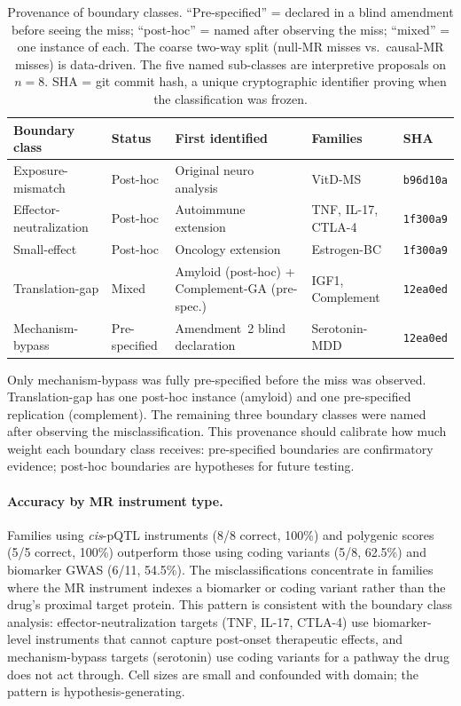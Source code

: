 \documentclass[11pt]{article}
\begin{document}
\begin{table}[t]
\centering
\caption{Provenance of boundary classes. ``Pre-specified'' = declared in a blind amendment before seeing the miss; ``post-hoc'' = named after observing the miss; ``mixed'' = one instance of each. The coarse two-way split (null-MR misses vs.\ causal-MR misses) is data-driven. The five named sub-classes are interpretive proposals on $n = 8$. SHA = git commit hash, a unique cryptographic identifier proving when the classification was frozen.}
\label{tab:provenance}
\small
\begin{tabular}{lllll}
\toprule
Boundary class & Status & First identified & Families & SHA \\
\midrule
Exposure-mismatch & Post-hoc & Original neuro analysis & VitD-MS & \texttt{b96d10a} \\
Effector-neutralization & Post-hoc & Autoimmune extension & TNF, IL-17, CTLA-4 & \texttt{1f300a9} \\
Small-effect & Post-hoc & Oncology extension & Estrogen-BC & \texttt{1f300a9} \\
Translation-gap & Mixed & Amyloid (post-hoc) + Complement-GA (pre-spec.) & IGF1, Complement & \texttt{12ea0ed} \\
Mechanism-bypass & Pre-specified & Amendment~2 blind declaration & Serotonin-MDD & \texttt{12ea0ed} \\
\bottomrule
\end{tabular}
\end{table}

Only mechanism-bypass was fully pre-specified before the miss was observed. Translation-gap has one post-hoc instance (amyloid) and one pre-specified replication (complement). The remaining three boundary classes were named after observing the misclassification. This provenance should calibrate how much weight each boundary class receives: pre-specified boundaries are confirmatory evidence; post-hoc boundaries are hypotheses for future testing.

\paragraph{Accuracy by MR instrument type.} Families using \emph{cis}-pQTL instruments (8/8 correct, 100\%) and polygenic scores (5/5 correct, 100\%) outperform those using coding variants (5/8, 62.5\%) and biomarker GWAS (6/11, 54.5\%). The misclassifications concentrate in families where the MR instrument indexes a biomarker or coding variant rather than the drug's proximal target protein. This pattern is consistent with the boundary class analysis: effector-neutralization targets (TNF, IL-17, CTLA-4) use biomarker-level instruments that cannot capture post-onset therapeutic effects, and mechanism-bypass targets (serotonin) use coding variants for a pathway the drug does not act through. Cell sizes are small and confounded with domain; the pattern is hypothesis-generating.
\end{document}
